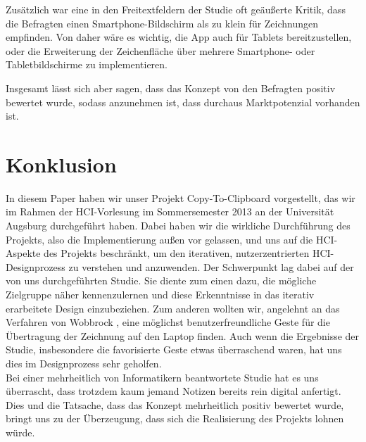 \documentclass{chi-ext}
\begin{document}
Zusätzlich war eine in den Freitextfeldern der Studie oft geäußerte Kritik, dass die Befragten einen Smartphone-Bildschirm als zu klein für Zeichnungen empfinden. Von daher wäre es wichtig, die App auch für Tablets bereitzustellen, oder die Erweiterung der Zeichenfläche über mehrere Smartphone- oder Tabletbildschirme zu implementieren.

Insgesamt lässt sich aber sagen, dass das Konzept von den Befragten positiv bewertet wurde, sodass anzunehmen ist, dass durchaus Marktpotenzial vorhanden ist.


\section{Konklusion}
In diesem Paper haben wir unser Projekt Copy-To-Clipboard vorgestellt, das wir im Rahmen der HCI-Vorlesung im Sommersemester 2013 an der Universität Augsburg durchgeführt haben. Dabei haben wir die wirkliche Durchführung des Projekts, also die Implementierung außen vor gelassen, und uns auf die HCI-Aspekte des Projekts beschränkt, um den iterativen, nutzerzentrierten HCI-Designprozess zu verstehen und anzuwenden.
Der Schwerpunkt lag dabei auf der von uns durchgeführten Studie. Sie diente zum einen dazu, die mögliche Zielgruppe näher kennenzulernen und diese Erkenntnisse in das iterativ erarbeitete Design einzubeziehen. Zum anderen wollten wir, angelehnt an das Verfahren von Wobbrock \cite{Wobbrock}, eine möglichst benutzerfreundliche Geste für die Übertragung der Zeichnung auf den Laptop finden. Auch wenn die Ergebnisse der Studie, insbesondere die favorisierte Geste etwas überraschend waren, hat uns dies im Designprozess sehr geholfen.\\
Bei einer mehrheitlich von Informatikern beantwortete Studie hat es uns überrascht, dass trotzdem kaum jemand Notizen bereits rein digital anfertigt.
Dies und die Tatsache, dass das Konzept mehrheitlich positiv bewertet wurde, bringt uns zu der Überzeugung, dass sich die Realisierung des Projekts lohnen würde.\\[35em]


\balance


\end{document}
